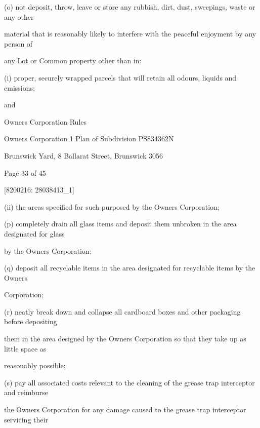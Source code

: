\documentclass{article}
\begin{document}
{\fontsize{9.962}{1}(o) not deposit, throw, leave or store any rubbish, dirt, dust, sweepings, waste or any other }

{\fontsize{10.02}{1}material that is reasonably likely to interfere with the peaceful enjoyment by any person of }

{\fontsize{10.02}{1}any Lot or Common property other than in: }

{\fontsize{9.962}{1}(i) proper, securely wrapped parcels that will retain all odours, liquids and emissions; }

{\fontsize{10.02}{1}and }

\newpage





{\fontsize{9}{1}Owners Corporation Rules }

{\fontsize{9}{1}Owners Corporation 1 Plan of Subdivision PS834362N }

{\fontsize{9}{1}Brunswick Yard, 8 Ballarat Street, Brunswick 3056 }


{\fontsize{9}{1}Page 33  of 45 }



{\fontsize{7.02}{1}[8200216: 28038413\_1] }

{\fontsize{9.962}{1}(ii) the areas specified for such purposed by the Owners Corporation; }

{\fontsize{9.962}{1}(p) completely drain all glass items and deposit them unbroken in the area designated for glass }

{\fontsize{10.02}{1}by the Owners Corporation;  }

{\fontsize{9.962}{1}(q) deposit all recyclable items in the area designated for recyclable items by the Owners }

{\fontsize{10.02}{1}Corporation; }

{\fontsize{9.962}{1}(r) neatly break down and collapse all cardboard boxes and other packaging before depositing }

{\fontsize{10.02}{1}them in the area designed by the Owners Corporation so that they take up as little space as }

{\fontsize{10.02}{1}reasonably possible; }

{\fontsize{9.962}{1}(s) pay all associated costs relevant to the cleaning of the grease trap interceptor and reimburse }

{\fontsize{10.02}{1}the Owners Corporation for any damage caused to the grease trap interceptor servicing their }
\end{document}
